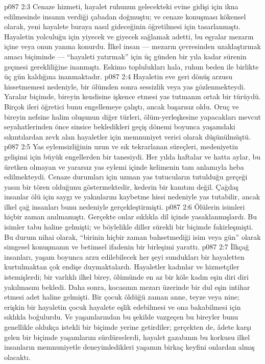 \vs p087 2:3 Cenaze hizmeti, hayalet ruhunun gelecekteki evine gidişi için ikna edilmesinde insanın verdiği çabadan doğmuştu; ve cenaze konuşması kökensel olarak, yeni hayalete buraya nasıl gideceğinin öğretilmesi için tasarlanmıştı. Hayaletin yolculuğu için yiyecek ve giyecek sağlamak adetti, bu eşyalar mezarın içine veya onun yanına konurdu. İlkel insan --- mezarın çevresinden uzaklaştırmak amacı biçiminde --- “hayaleti yatırmak” için üç günden bir yıla kadar sürenin geçmesi gerekliliğine inanmıştı. Eskimo toplulukları hala, ruhun beden ile birlikte üç gün kaldığına inanmaktadır.
\vs p087 2:4 Hayaletin eve geri dönüş arzusu hissetmemesi nedeniyle, bir ölümden sonra sessizlik veya yas gözlenmekteydi. Yaralar biçimde, bireyin kendisine işkence etmesi yas tutmanın ortak bir türüydü. Birçok ileri öğretici bunu engellemeye çalıştı, ancak başarısız oldu. Oruç ve bireyin nefsine halim oluşunun diğer türleri, ölüm\hyp{}yerleşkesine yapacakları mevcut seyahatlerinden önce sinsice bekledikleri geçiş dönemi boyunca yaşamdaki sıkıntılardan zevk alan hayaletler için memnuniyet verici olarak düşünülmüştü.
\vs p087 2:5 Yas eylemsizliğinin uzun ve sık tekrarlanan süreçleri, medeniyetin gelişimi için büyük engellerden bir tanesiydi. Her yılda haftalar ve hatta aylar, bu üretken olmayan ve yararsız yas eylemi içinde kelimenin tam anlamıyla heba edilmekteydi. Cenaze durumları için uzman yas tutucuların tutulduğu gerçeği yasın bir tören olduğunu göstermektedir, kederin bir kanıtını değil. Çağdaş insanlar ölü için saygı ve yakınlarını kaybetme hissi nedeniyle yas tutabilir, ancak ilkel çağ insanları bunu  nedeniyle gerçekleştirmişti.
\vs p087 2:6 Ölülerin isimleri hiçbir zaman anılmamıştı. Gerçekte onlar sıklıkla dil içinde yasaklanmışlardı. Bu isimler tabu haline gelmişti; ve böylelikle diller sürekli bir biçimde fakirleşmişti. Bu durum nihai olarak, “birinin hiçbir zaman bahsetmediği isim veya gün” olarak simgesel konuşmanın ve betimsel ifadenin bir birleşimi yarattı.
\vs p087 2:7 İlkçağ insanları, yaşam boyunca arzu edilebilecek her şeyi sundukları bir hayaletten kurtulmaktan çok endişe duymaktalardı. Hayaletler kadınlar ve hizmetçiler istemişlerdi; bir varlıklı ilkel birey, ölümünde en az bir köle kadın eşin diri diri yakılmasını bekledi. Daha sonra, kocasının mezarı üzerinde bir dul eşin intihar etmesi adet haline gelmişti. Bir çocuk öldüğü zaman anne, teyze veya nine; erişkin bir hayaletin çocuk hayalete eşlik edebilmesi ve ona bakabilmesi için sıklıkla boğulurdu. Ve yaşamlarından bu şekilde vazgeçen bu bireyler bunu genellikle oldukça istekli bir biçimde yerine getirdiler; gerçekten de, âdete karşı gelen bir biçimde yaşamlarını sürdürselerdi, hayalet gazabının bu korkusu ilkel insanların memnuniyetle deneyimledikleri yaşamın birkaç keyfini onlardan almış olacaktı.
